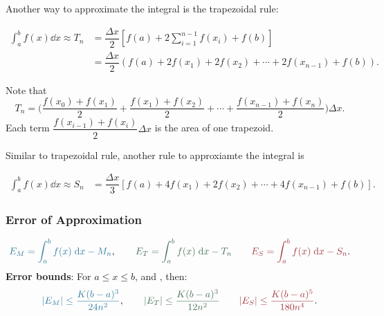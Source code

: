 Another way to approximate the integral is the trapezoidal rule:
\begin{tcolorbox}
\begin{thm}
    \begin{align*}
        \int_a^b f(x) \dd x \approx T_n &= \dfrac{\Delta x}{2} \left[f(a) + 2\sum_{i=1}^{n-1} f(x_i) + f(b)\right]\\
        &= \dfrac{\Delta x}{2} \left(f(a) + 2f(x_1) + 2f(x_2) + \cdots + 2f(x_{n-1}) + f(b)\right).
    \end{align*}
\end{thm}
\end{tcolorbox}

Note that 
\[T_n = \Bigg( \dfrac{f(x_0)+f(x_1)}{2} + \dfrac{f(x_1)+f(x_2)}{2} + \cdots + \dfrac{f(x_{n-1})+f(x_n)}{2} \Bigg) \Delta x.\]
Each term $\dfrac{f(x_{i-1})+f(x_i)}{2} \Delta x$ is the area of one trapezoid.

Similar to trapezoidal rule, another rule to approxiamte the integral is 
\begin{tcolorbox}[colframe=enji!80, colback=enji!5]
\begin{thm}
    \begin{align*}
        \int_a^b f(x) \dd x \approx S_n &= \dfrac{\Delta x}{3} \left[f(a) + 4f(x_1) + 2f(x_2) + \cdots + 4f(x_{n-1}) + f(b)\right].
    \end{align*}
\end{thm}
\end{tcolorbox}


\subsubsection{Error of Approximation}
\begin{align*}
    \blue{E_M = \dint_a^b f(x) \dd x - M_n}, \qquad
    \green{E_T = \dint_a^b f(x) \dd x - T_n} \qquad
    \red{E_S = \dint_a^b f(x) \dd x - S_n}.
\end{align*}
\textbf{Error bounds}: For $a \leq x \leq b$,  and , then:
\begin{align*}
    \blue{|E_M| \leq \dfrac{K (b-a)^3}{24n^2}}, \qquad
    \green{|E_T| \leq \dfrac{K (b-a)^3}{12n^2}} \qquad \red{|E_S| \leq \dfrac{K (b-a)^5}{180n^4}}.
\end{align*}


